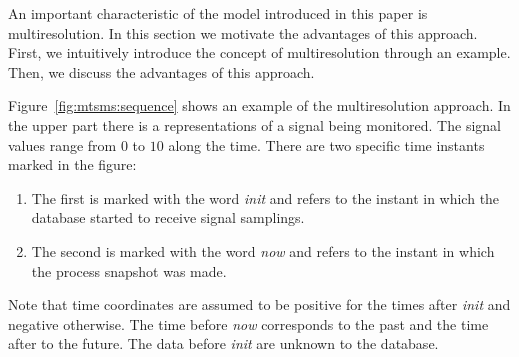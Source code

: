 


An important characteristic of the model introduced in this paper is
multiresolution. In this section we motivate the advantages of this
approach. First, we intuitively introduce the concept of
multiresolution through an example. Then, we discuss the advantages of
this approach.

Figure~\ref{fig:mtsms:sequence} shows an example of the
multiresolution approach. 
%
In the upper part there is a representations of a signal being
monitored. The signal values range from $0$ to $10$ along the
time. There are two specific time instants marked in the figure:
\begin{enumerate}
\item The first is marked with the word \emph{init} and refers to the
  instant in which the database started to receive signal samplings.
\item The second is marked with the word \emph{now} and refers to the
  instant in which the process snapshot was made.
\end{enumerate}
Note that time coordinates are assumed to be positive for the times
after \emph{init} and negative otherwise. The time before \emph{now}
corresponds to the past and the time after to the future.
The data before \emph{init} are unknown to the database.

